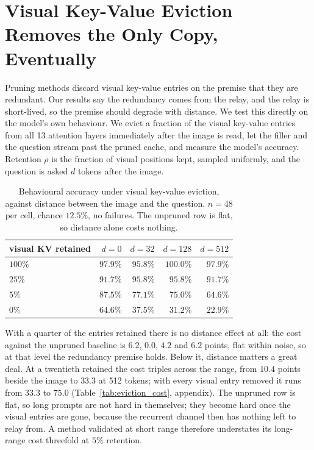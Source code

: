 \section{Visual Key-Value Eviction Removes the Only Copy, Eventually}
\label{sec:eviction}

Pruning methods discard visual key-value entries on the premise that they are
redundant. Our results say the redundancy comes from the relay, and the relay
is short-lived, so the premise should degrade with distance. We test this
directly on the model's own behaviour. We evict a fraction of the visual
key-value entries from all 13 attention layers immediately after the image is
read, let the filler and the question stream past the pruned cache, and
measure the model's accuracy. Retention $\rho$ is the fraction of visual
positions kept, sampled uniformly, and the question is asked $d$ tokens after
the image.

\begin{table}[t]
\centering\small
\begin{tabular}{lrrrr}
\toprule
visual KV retained & $d{=}0$ & $d{=}32$ & $d{=}128$ & $d{=}512$ \\
\midrule
$100\%$ & $97.9\%$ & $95.8\%$ & $100.0\%$ & $97.9\%$ \\
$25\%$  & $91.7\%$ & $95.8\%$ & $95.8\%$  & $91.7\%$ \\
$5\%$   & $87.5\%$ & $77.1\%$ & $75.0\%$  & $64.6\%$ \\
$0\%$   & $64.6\%$ & $37.5\%$ & $31.2\%$  & $22.9\%$ \\
\bottomrule
\end{tabular}
\caption{Behavioural accuracy under visual key-value eviction, against distance
between the image and the question. $n = 48$ per cell, chance $12.5\%$, no
failures. The unpruned row is flat, so distance alone costs nothing.}
\label{tab:eviction}
\end{table}

With a quarter of the entries retained there is no distance effect at all: the
cost against the unpruned baseline is $6.2$, $0.0$, $4.2$ and $6.2$ points,
flat within noise, so at that level the redundancy premise holds. Below it,
distance matters a great deal. At a twentieth retained the cost triples across
the range, from $10.4$ points beside the image to $33.3$ at 512 tokens; with
every visual entry removed it runs from $33.3$ to $75.0$
(Table~\ref{tab:eviction_cost}, appendix). The unpruned row is flat, so long
prompts are not hard in themselves; they become hard once the visual entries
are gone, because the recurrent channel then has nothing left to relay from. A
method validated at short range therefore understates its long-range cost
threefold at $5\%$ retention.

